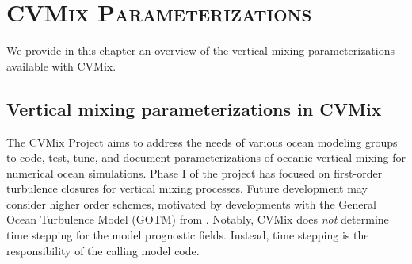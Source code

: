 \chapter{\scshape CVMix Parameterizations}
\label{chapter:cvmix_intro}

\minitoc
\vspace{.5cm}

We provide in this chapter an overview of the vertical mixing
parameterizations available with CVMix.


\section{Vertical mixing parameterizations in CVMix}
\label{section:vert_mix_schemes_cvmix}

The CVMix Project aims to address the needs of various ocean modeling
groups to code, test, tune, and document parameterizations of oceanic
vertical mixing for numerical ocean simulations.  Phase I of the
project has focused on first-order turbulence closures for vertical
mixing processes.  Future development may consider higher order
schemes, motivated by developments with the General Ocean Turbulence
Model (GOTM) from \cite{GOTM}.  Notably, CVMix does {\it not}
determine time stepping for the model prognostic fields.  Instead,
time stepping is the responsibility of the calling model code.  

